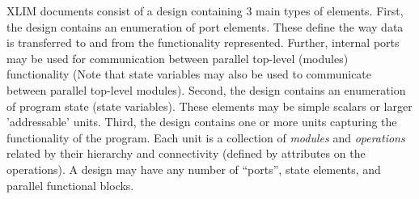 XLIM documents consist of a design containing 3 main types of elements.
First, the design contains an enumeration of port elements.  These define the
way data is transferred to and from the functionality represented.  Further,
internal ports may be used for communication between parallel top-level (modules)
functionality (Note that state variables may also be used to communicate between
parallel top-level modules).  Second, the design contains an enumeration of
program state (state variables).  These elements may be simple scalars or larger
'addressable' units.  Third, the design contains one or more units capturing the
functionality of the program.  Each unit is a collection of {\it modules}
and {\it operations} related by their hierarchy and connectivity (defined
by attributes on the operations). A design may have any number of ``ports'',
state elements, and parallel functional blocks.  







